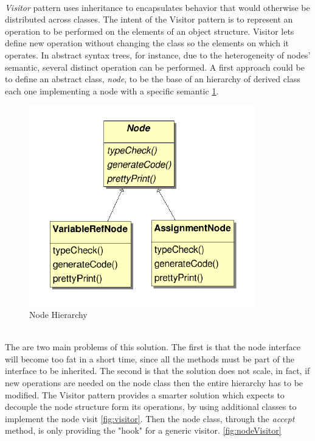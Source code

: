 \paragraph{} \textit{Visitor} pattern uses inheritance to encapsulates behavior that would otherwise be distributed across classes. The intent of the Visitor pattern is to represent an operation to be performed on the elements of an object structure. Visitor lets define new operation without changing the class so the elements on which it operates. In abstract syntax trees, for instance, due to the heterogeneity of nodes' semantic, several distinct operation can be performed. A first approach could be to define an abstract class, \textit{node}, to be the base of an hierarchy of derived class each one implementing a node with a specific semantic \ref{fig:nodehierarchy}.
\begin{figure}[!h]
\centering
\includegraphics[width=.35\textwidth]{Figs/nodesimple.PNG}
\caption{Node Hierarchy}
\label{fig:nodehierarchy}
\end{figure}
\noindent
\\
The are two main problems of this solution. The first is that the node interface will become too fat in a short time, since all the methods must be part of the interface to be inherited. The second is that the solution does not scale, in fact, if new operations are needed on the node class then the entire hierarchy has to be modified. The Visitor pattern provides a smarter solution which expects to decouple the node structure form its operations, by using additional classes to implement the node visit \ref{fig:visitor}. Then the node class, through the \textit{accept} method, is only providing the "hook" for a generic visitor. \ref{fig:nodeVisitor}

